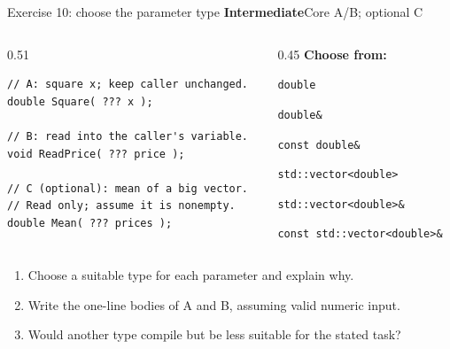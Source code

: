 \documentclass[10pt,aspectratio=169]{beamer}
\newcommand{\exerciseinfo}[2]{%
  \textbf{#1}\hfill{\small #2}\par
}
\begin{document}
\begin{frame}[fragile]{Exercise 10: choose the parameter type}
\relax
\exerciseinfo{Intermediate}{Core A/B; optional C}
\begin{columns}[T,onlytextwidth]
\begin{column}{0.51\textwidth}
\begin{lstlisting}
// A: square x; keep caller unchanged.
double Square( ??? x );

// B: read into the caller's variable.
void ReadPrice( ??? price );

// C (optional): mean of a big vector.
// Read only; assume it is nonempty.
double Mean( ??? prices );
\end{lstlisting}
\end{column}
\begin{column}{0.45\textwidth}
\textbf{Choose from:}\par
\texttt{double}\par
\texttt{double\&}\par
\texttt{const double\&}\par
\texttt{std::vector<double>}\par
\texttt{std::vector<double>\&}\par
\texttt{const std::vector<double>\&}
\end{column}
\end{columns}
\begin{enumerate}
\item Choose a suitable type for each parameter and explain why.
\item Write the one-line bodies of A and B, assuming valid numeric input.
\item Would another type compile but be less suitable for the stated task?
\end{enumerate}
\end{frame}
\end{document}
